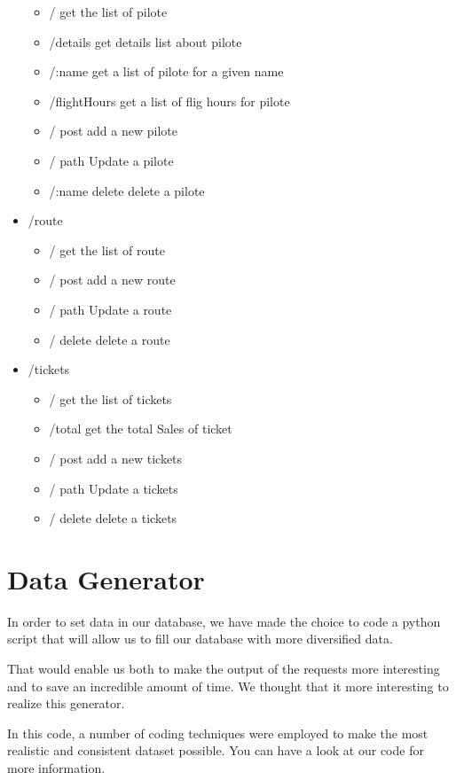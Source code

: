\documentclass{article}
\begin{document}
\begin{itemize}
\begin{itemize}
                \item / get the list of pilote
                \item /details get details list about pilote
                \item /:name get a list of pilote for a given name
                \item /flightHours get a list of flig hours for pilote
                \item / post add a new pilote  
                \item / path Update a pilote
                \item /:name delete delete a pilote
            \end{itemize}
        \item /route
            \begin{itemize}
                \item / get the list of route
                \item / post add a new route  
                \item / path Update a route
                \item / delete delete a route
            \end{itemize}
        \item /tickets
            \begin{itemize}
                \item / get the list of tickets
                \item /total get the total Sales of ticket
                \item / post add a new tickets  
                \item / path Update a tickets
                \item / delete delete a tickets
            \end{itemize}
    \end{itemize}
    
    \section{Data Generator}
    
    In order to set data in our database, we have made the choice to code a python script that will allow us to fill our database with more diversified data. \newline

    That would enable us both to make the output of the requests more interesting and to save an incredible amount of time. We thought that it more interesting to realize this generator. \newline
    
    In this code, a number of coding techniques were employed to make the most realistic and consistent dataset possible. You can have a look at our code for more information.
\end{document}
